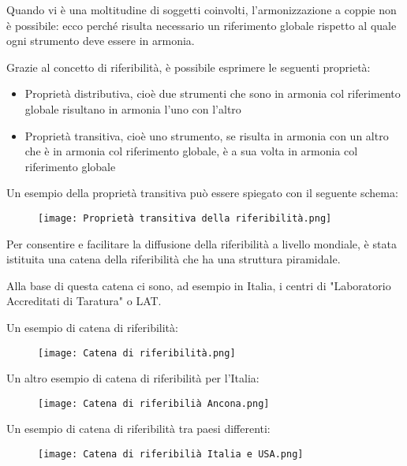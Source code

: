 Quando vi è una moltitudine di soggetti coinvolti, 
l'armonizzazione a coppie non è possibile: ecco perché risulta necessario un riferimento globale 
rispetto al quale ogni strumento deve essere in armonia. \newline 

Grazie al concetto di riferibilità, 
è possibile esprimere le seguenti proprietà: 

\begin{itemize}
    \item Proprietà distributiva, cioè due strumenti che sono in armonia col riferimento globale risultano in armonia l'uno con l'altro 
    \item Proprietà transitiva, cioè uno strumento, se risulta in armonia con un altro che è in armonia col riferimento globale, è a sua volta in armonia col riferimento globale
\end{itemize}

Un esempio della proprietà transitiva può essere spiegato con il seguente schema: 

\begin{figure}[h]
    \centering
    \texttt{[image: Proprietà transitiva della riferibilità.png]}
\end{figure}

Per consentire e facilitare la diffusione della riferibilità a livello mondiale, 
è stata istituita una catena della riferibilità che ha una struttura piramidale. \newline 

Alla base di questa catena ci sono, ad esempio in Italia, i centri di "Laboratorio Accreditati di Taratura" o LAT. \newline 

\newpage 

Un esempio di catena di riferibilità: 

\begin{figure}[h]
    \centering
    \texttt{[image: Catena di riferibilità.png]}
\end{figure}

Un altro esempio di catena di riferibilità per l'Italia: 

\begin{figure}[h]
    \centering
    \texttt{[image: Catena di riferibilià Ancona.png]}
\end{figure}

Un esempio di catena di riferibilità tra paesi differenti: 

\begin{figure}[h]
    \centering
    \texttt{[image: Catena di riferibilià Italia e USA.png]}
\end{figure}

